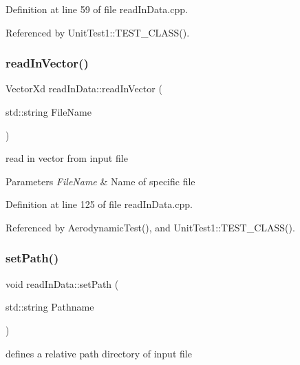 Definition at line 59 of file read\+In\+Data.\+cpp.



Referenced by Unit\+Test1\+::\+T\+E\+S\+T\+\_\+\+C\+L\+A\+S\+S().

\mbox{\label{classread_in_data_ab57aff38529234593d786ecace301cf7}} 
\subsubsection{\texorpdfstring{read\+In\+Vector()}{readInVector()}}
{\footnotesize\ttfamily Vector\+Xd read\+In\+Data\+::read\+In\+Vector (\begin{DoxyParamCaption}\item[{std\+::string}]{File\+Name }\end{DoxyParamCaption})}



read in vector from input file 


\begin{DoxyParams}{Parameters}
{\em File\+Name} & Name of specific file \\
\hline
\end{DoxyParams}


Definition at line 125 of file read\+In\+Data.\+cpp.



Referenced by Aerodynamic\+Test(), and Unit\+Test1\+::\+T\+E\+S\+T\+\_\+\+C\+L\+A\+S\+S().

\mbox{\label{classread_in_data_ad67d566fd837f6d721db279144d484e0}} 
\subsubsection{\texorpdfstring{set\+Path()}{setPath()}}
{\footnotesize\ttfamily void read\+In\+Data\+::set\+Path (\begin{DoxyParamCaption}\item[{std\+::string}]{Pathname }\end{DoxyParamCaption})}



defines a relative path directory of input file 


